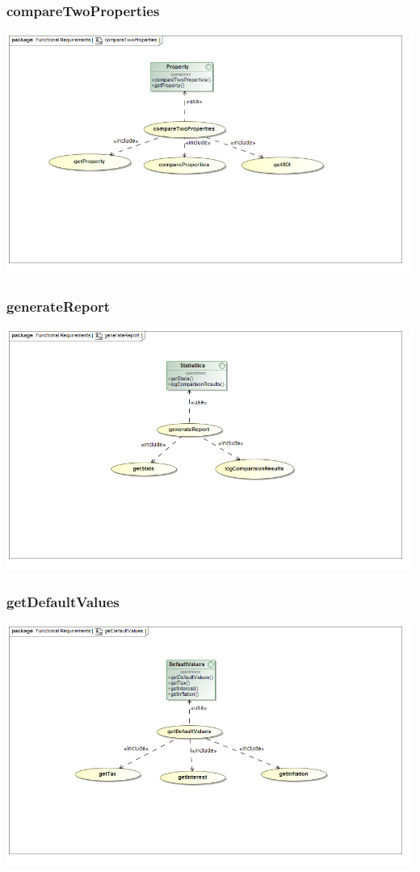 \documentclass[a4paper,12pt]{article}
\begin{document}
\subsubsection{compareTwoProperties}
\includegraphics[width=1\textwidth]{./Images/requiredFunctionality/compareTwoProperties.png}
\subsubsection{generateReport}
\includegraphics[width=1\textwidth]{./Images/requiredFunctionality/generateReport.png}
\subsubsection{getDefaultValues}
\includegraphics[width=1\textwidth]{./Images/requiredFunctionality/getDefaultValues.png}
\end{document}
